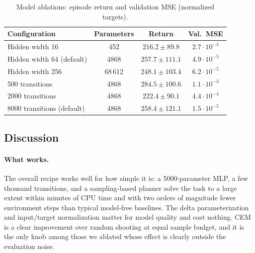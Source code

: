 \documentclass{article}
\begin{document}
\begin{table}[t]
  \caption{Model ablations: episode return and validation MSE (normalized targets).}
  \label{tab:model}
  \centering
  \begin{tabular}{lccc}
    \toprule
    Configuration & Parameters & Return & Val.\ MSE \\
    \midrule
    Hidden width 16 & 452 & $216.2 \pm 89.8$ & $2.7 \cdot 10^{-5}$ \\
    Hidden width 64 (default) & 4868 & $257.7 \pm 111.1$ & $4.9 \cdot 10^{-5}$ \\
    Hidden width 256 & 68\,612 & $248.1 \pm 103.4$ & $6.2 \cdot 10^{-5}$ \\
    \midrule
    500 transitions & 4868 & $284.5 \pm 100.6$ & $1.1 \cdot 10^{-3}$ \\
    2000 transitions & 4868 & $222.4 \pm 90.1$ & $4.4 \cdot 10^{-4}$ \\
    8000 transitions (default) & 4868 & $258.4 \pm 121.1$ & $1.5 \cdot 10^{-5}$ \\
    \bottomrule
  \end{tabular}
\end{table}

\subsection{Discussion}
\label{sec:discussion}

\paragraph{What works.} The overall recipe works well for how simple it is: a 5000-parameter MLP, a few thousand transitions, and a sampling-based planner solve the task to a large extent within minutes of CPU time and with two orders of magnitude fewer environment steps than typical model-free baselines. The delta parameterization and input/target normalization matter for model quality and cost nothing. CEM is a clear improvement over random shooting at equal sample budget, and it is the only knob among those we ablated whose effect is clearly outside the evaluation noise.
\end{document}
